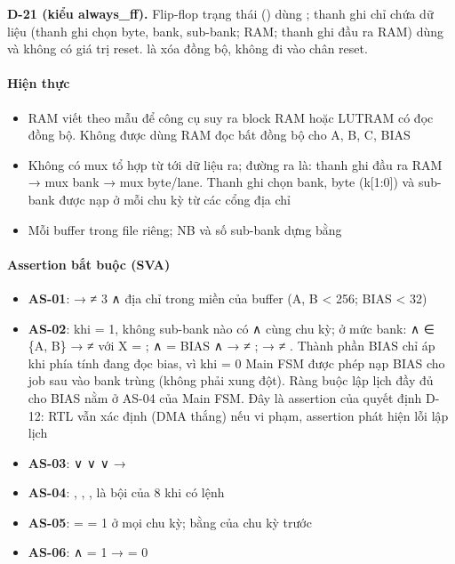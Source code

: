 \documentclass[10pt,a4paper]{article}
\begin{document}
\begin{notebox}
\textbf{D-21 (kiểu always\_ff).} Flip-flop trạng thái () dùng ; thanh ghi chỉ chứa dữ liệu (thanh ghi chọn byte, bank, sub-bank; RAM; thanh ghi đầu ra RAM) dùng  và không có giá trị reset.  là xóa đồng bộ, không đi vào chân reset.
\end{notebox}

\paragraph{Hiện thực}
\begin{itemize}
\item RAM viết theo mẫu  để công cụ suy ra block RAM hoặc LUTRAM có đọc đồng bộ. Không được dùng RAM đọc bất đồng bộ cho A, B, C, BIAS
\item Không có mux tổ hợp từ  tới dữ liệu ra; đường ra là: thanh ghi đầu ra RAM → mux bank → mux byte/lane. Thanh ghi chọn bank, byte (k[1:0]) và sub-bank được nạp ở mỗi chu kỳ từ các cổng địa chỉ
\item Mỗi buffer trong file riêng; NB và số sub-bank dựng bằng 
\end{itemize}

\paragraph{Assertion bắt buộc (SVA)}
\begin{itemize}
\item \textbf{AS-01}:  →  ≠ 3 ∧ địa chỉ trong miền của buffer (A, B < 256; BIAS < 32)
\item \textbf{AS-02}: khi  = 1, không sub-bank nào có  ∧  cùng chu kỳ; ở mức bank:  ∧  ∈ \{A, B\} →  ≠  với X = ;  ∧  = BIAS ∧  →  ≠ ;  →  ≠ . Thành phần BIAS chỉ áp khi phía tính đang đọc bias, vì khi  = 0 Main FSM được phép nạp BIAS cho job sau vào bank trùng  (không phải xung đột). Ràng buộc lập lịch đầy đủ cho BIAS nằm ở AS-04 của Main FSM. Đây là assertion của quyết định D-12: RTL vẫn xác định (DMA thắng) nếu vi phạm, assertion phát hiện lỗi lập lịch
\item \textbf{AS-03}:  ∨  ∨  ∨  → 
\item \textbf{AS-04}: , , ,  là bội của 8 khi có lệnh
\item \textbf{AS-05}:  =  = 1 ở mọi chu kỳ;  bằng  của chu kỳ trước
\item \textbf{AS-06}:  ∧  = 1 →  = 0
\end{itemize}
\end{document}
